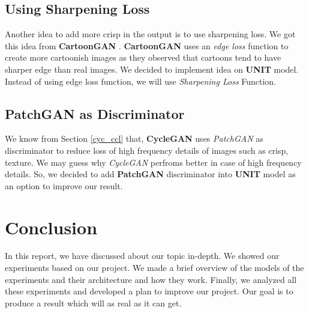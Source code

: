 \subsection{Using Sharpening Loss}
Another idea to add more crisp in the output is to use sharpening loss. We got this idea from \textbf{CartoonGAN} \cite{cartoonGAN}. \textbf{CartoonGAN} uses an \textit{edge loss} function to create more cartoonish images as they observed that cartoons tend to have sharper edge than real images. We decided to implement idea on \textbf{UNIT} model. Instead of using edge loss function, we will use \textit{Sharpening Loss} Function.
\subsection{PatchGAN as Discriminator}

We know from Section \ref{cyc_ccl} that, \textbf{CycleGAN} uses \textit{PatchGAN} as discriminator to reduce loss of high frequency details of images such as crisp, texture. We may guess why \textit{CycleGAN} perfroms better in case of high frequency details. So, we decided to add \textbf{PatchGAN} discriminator into \textbf{UNIT} model as an option to improve our result.

\section{Conclusion}
In this report, we have discussed about our topic in-depth. We showed our experiments based on our project. We made a brief overview of the models of the experiments and their architecture and how they work. Finally, we analyzed all these experiments and developed a plan to improve our project. Our goal is to produce a result which will as real as it can get.